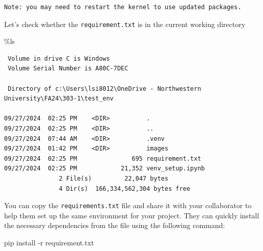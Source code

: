 \documentclass[
  letterpaper,
  DIV=11,
  numbers=noendperiod]{scrreprt}
\newenvironment{Shaded}{\begin{snugshade}}{\end{snugshade}}
\newcommand{\NormalTok}[1]{\textcolor[rgb]{0.00,0.23,0.31}{#1}}
\newcommand{\OperatorTok}[1]{\textcolor[rgb]{0.37,0.37,0.37}{#1}}
\begin{document}
\begin{verbatim}
Note: you may need to restart the kernel to use updated packages.
\end{verbatim}

Let's check whether the \texttt{requirement.txt} is in the current
working directory

\begin{Shaded}
\begin{Highlighting}[]
\OperatorTok{\%}\NormalTok{ls}
\end{Highlighting}
\end{Shaded}

\begin{verbatim}
 Volume in drive C is Windows
 Volume Serial Number is A80C-7DEC

 Directory of c:\Users\lsi8012\OneDrive - Northwestern University\FA24\303-1\test_env

09/27/2024  02:25 PM    <DIR>          .
09/27/2024  02:25 PM    <DIR>          ..
09/27/2024  07:44 AM    <DIR>          .venv
09/27/2024  01:42 PM    <DIR>          images
09/27/2024  02:25 PM               695 requirement.txt
09/27/2024  02:25 PM            21,352 venv_setup.ipynb
               2 File(s)         22,047 bytes
               4 Dir(s)  166,334,562,304 bytes free
\end{verbatim}

You can copy the \texttt{requirements.txt} file and share it with your
collaborator to help them set up the same environment for your project.
They can quickly install the necessary dependencies from the file using
the following command:

\begin{Shaded}
\begin{Highlighting}[]
\NormalTok{pip install }\OperatorTok{{-}}\NormalTok{r requirement.txt}
\end{Highlighting}
\end{Shaded}
\end{document}
